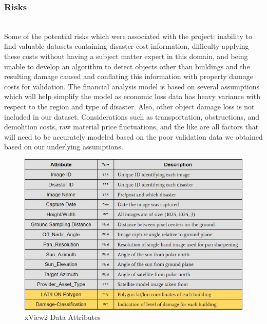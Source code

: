 \documentclass[conference]{IEEEtran}
\begin{document}
\subsubsection{Risks} \\
\textbullet Some of the potential risks which were associated with the project: inability to find valuable datasets containing disaster cost information, difficulty applying these costs without having a subject matter expert in this domain, and being unable to develop an algorithm to detect objects other than buildings and the resulting damage caused and conflating this information with property damage costs for validation. The financial analysis model is based on several assumptions which will help simplify the model as economic loss data has heavy variance with respect to the region and type of disaster. Also, other object damage loss is not included in our dataset. Considerations such as transportation, obstructions, and demolition costs, raw material price fluctuations, and the like are all factors that will need to be accurately modeled based on the poor validation data we obtained based on our underlying assumptions. 


\begin{figure}[h]
\centering\includegraphics[width=1\linewidth]{data.JPG}
\caption{xView2 Data Attributes}
\label{xviewattr}
\end{figure}
\end{document}

